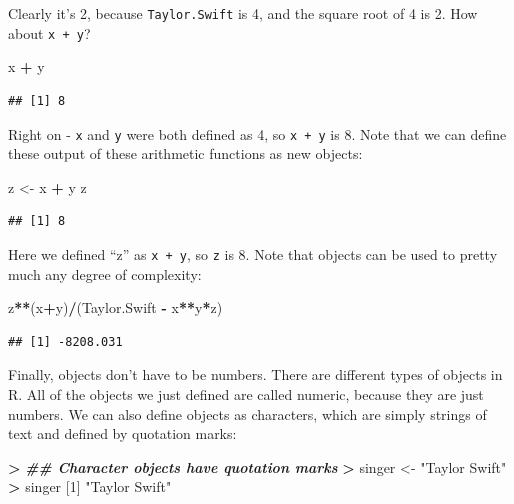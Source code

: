 \documentclass[
]{book}
\newenvironment{Shaded}{\begin{snugshade}}{\end{snugshade}}
\newcommand{\DecValTok}[1]{\textcolor[rgb]{0.00,0.00,0.81}{#1}}
\newcommand{\DocumentationTok}[1]{\textcolor[rgb]{0.56,0.35,0.01}{\textbf{\textit{#1}}}}
\newcommand{\ErrorTok}[1]{\textcolor[rgb]{0.64,0.00,0.00}{\textbf{#1}}}
\newcommand{\NormalTok}[1]{#1}
\newcommand{\OtherTok}[1]{\textcolor[rgb]{0.56,0.35,0.01}{#1}}
\newcommand{\SpecialCharTok}[1]{\textcolor[rgb]{0.81,0.36,0.00}{\textbf{#1}}}
\newcommand{\StringTok}[1]{\textcolor[rgb]{0.31,0.60,0.02}{#1}}
\begin{document}
Clearly it's 2, because \texttt{Taylor.Swift} is 4, and the square root of 4 is 2. How about \texttt{x\ +\ y}?

\begin{Shaded}
\begin{Highlighting}[]
\NormalTok{x }\SpecialCharTok{+}\NormalTok{ y}
\end{Highlighting}
\end{Shaded}

\begin{verbatim}
## [1] 8
\end{verbatim}

Right on - \texttt{x} and \texttt{y} were both defined as 4, so \texttt{x\ +\ y} is 8. Note that we can define these output of these arithmetic functions as new objects:

\begin{Shaded}
\begin{Highlighting}[]
\NormalTok{z }\OtherTok{\textless{}{-}}\NormalTok{ x }\SpecialCharTok{+}\NormalTok{ y}
\NormalTok{z}
\end{Highlighting}
\end{Shaded}

\begin{verbatim}
## [1] 8
\end{verbatim}

Here we defined ``z'' as \texttt{x\ +\ y}, so \texttt{z} is 8. Note that objects can be used to pretty much any degree of complexity:

\begin{Shaded}
\begin{Highlighting}[]
\NormalTok{z}\SpecialCharTok{**}\NormalTok{(x}\SpecialCharTok{+}\NormalTok{y)}\SpecialCharTok{/}\NormalTok{(Taylor.Swift }\SpecialCharTok{{-}}\NormalTok{ x}\SpecialCharTok{**}\NormalTok{y}\SpecialCharTok{*}\NormalTok{z)}
\end{Highlighting}
\end{Shaded}

\begin{verbatim}
## [1] -8208.031
\end{verbatim}

Finally, objects don't have to be numbers. There are different types of objects in R. All of the objects we just defined are called numeric, because they are just numbers. We can also define objects as characters, which are simply strings of text and defined by quotation marks:

\begin{Shaded}
\begin{Highlighting}[]
\SpecialCharTok{\textgreater{}} \DocumentationTok{\#\# Character objects have quotation marks}
\ErrorTok{\textgreater{}}\NormalTok{ singer }\OtherTok{\textless{}{-}} \StringTok{"Taylor Swift"}
\SpecialCharTok{\textgreater{}}\NormalTok{ singer}
\NormalTok{[}\DecValTok{1}\NormalTok{] }\StringTok{"Taylor Swift"}
\end{Highlighting}
\end{Shaded}
\end{document}
